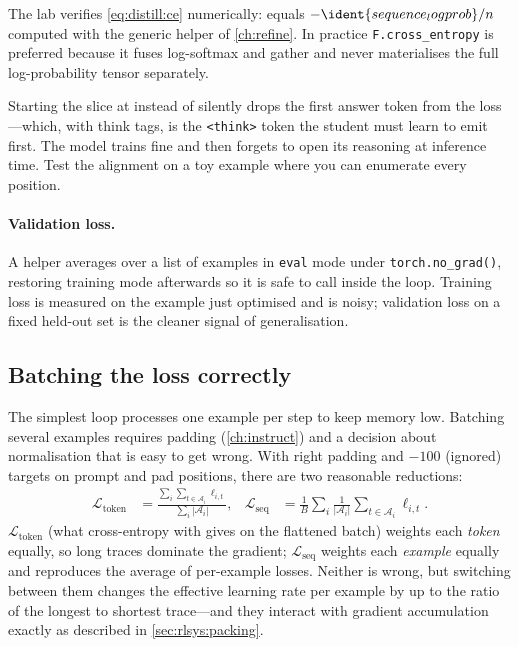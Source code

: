 The lab verifies \cref{eq:distill:ce} numerically:  equals
$-\ident{sequence_logprob}/n$ computed with the generic helper of \cref{ch:refine}. In
practice \texttt{F.cross\_entropy} is preferred because it fuses log-softmax and gather and
never materialises the full log-probability tensor separately.

\begin{pitfall}
Starting the slice at  instead of  silently drops the
first answer token from the loss---which, with think tags, is the \texttt{<think>} token the
student must learn to emit first. The model trains fine and then forgets to open its
reasoning at inference time. Test the alignment on a toy example where you can enumerate every
position.
\end{pitfall}

\paragraph{Validation loss.} A helper averages  over a list of examples
in \texttt{eval} mode under \texttt{torch.no\_grad()}, restoring training mode afterwards so it
is safe to call inside the loop. Training loss is measured on the example just optimised and is
noisy; validation loss on a fixed held-out set is the cleaner signal of generalisation.

\subsection{Batching the loss correctly}

The simplest loop processes one example per step to keep memory low. Batching several examples
requires padding (\cref{ch:instruct}) and a decision about normalisation that is easy to get
wrong. With right padding and $-100$ (ignored) targets on prompt and pad positions, there are
two reasonable reductions:
\begin{align}
\mathcal{L}_{\text{token}} &= \frac{\sum_i \sum_{t\in\mathcal{A}_i} \ell_{i,t}}{\sum_i |\mathcal{A}_i|},&
\mathcal{L}_{\text{seq}} &= \frac{1}{B}\sum_i \frac{1}{|\mathcal{A}_i|}\sum_{t\in\mathcal{A}_i}\ell_{i,t}.
\end{align}
$\mathcal{L}_{\text{token}}$ (what cross-entropy with  gives on the
flattened batch) weights each \emph{token} equally, so long traces dominate the gradient;
$\mathcal{L}_{\text{seq}}$ weights each \emph{example} equally and reproduces the average of
per-example losses. Neither is wrong, but switching between them changes the effective learning
rate per example by up to the ratio of the longest to shortest trace---and they interact with
gradient accumulation exactly as described in \cref{sec:rlsys:packing}.

